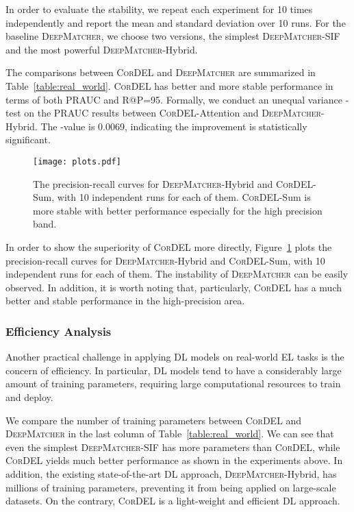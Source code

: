 \documentclass[conference]{IEEEtran}
\begin{document}
In order to evaluate the stability, we repeat each experiment for 10 times independently and report the mean and standard deviation over 10 runs. For the baseline \textsc{DeepMatcher}, we choose two versions, the simplest \textsc{DeepMatcher}-SIF and the most powerful \textsc{DeepMatcher}-Hybrid.

The comparisons between \textsc{CorDEL} and \textsc{DeepMatcher} are summarized in Table~\ref{table:real_world}. \textsc{CorDEL} has better and more stable performance in terms of both PRAUC and R@P=95. Formally, we conduct an unequal variance -test on the PRAUC results between \textsc{CorDEL}-Attention and \textsc{DeepMatcher}-Hybrid. The -value is 0.0069, indicating the improvement is statistically significant.

\begin{figure}
	\centering
	\texttt{[image: plots.pdf]}
	\caption{The precision-recall curves for \textsc{DeepMatcher}-Hybrid and \textsc{CorDEL}-Sum, with 10 independent runs for each of them. \textsc{CorDEL}-Sum is more stable with better performance especially for the high precision band.}
	\label{fig:plots}
\end{figure}

In order to show the superiority of \textsc{CorDEL} more directly, Figure~\ref{fig:plots} plots the precision-recall curves for \textsc{DeepMatcher}-Hybrid and \textsc{CorDEL}-Sum, with 10 independent runs for each of them. The instability of \textsc{DeepMatcher} can be easily observed. In addition, it is worth noting that, particularly, \textsc{CorDEL} has a much better and stable performance in the high-precision area.

\subsubsection{Efficiency Analysis}\label{sec:efficiency}

Another practical challenge in applying DL models on real-world EL tasks is the concern of efficiency. In particular, DL models tend to have a considerably large amount of training parameters, requiring large computational resources to train and deploy.

We compare the number of training parameters between \textsc{CorDEL} and \textsc{DeepMatcher} in the last column of Table~\ref{table:real_world}. We can see that even the simplest \textsc{DeepMatcher}-SIF has more parameters than \textsc{CorDEL}, while \textsc{CorDEL} yields much better performance as shown in the experiments above. In addition, the existing state-of-the-art DL approach, \textsc{DeepMatcher}-Hybrid, has millions of training parameters, preventing it from being applied on large-scale datasets. On the contrary, \textsc{CorDEL} is a light-weight and efficient DL approach.
\end{document}
